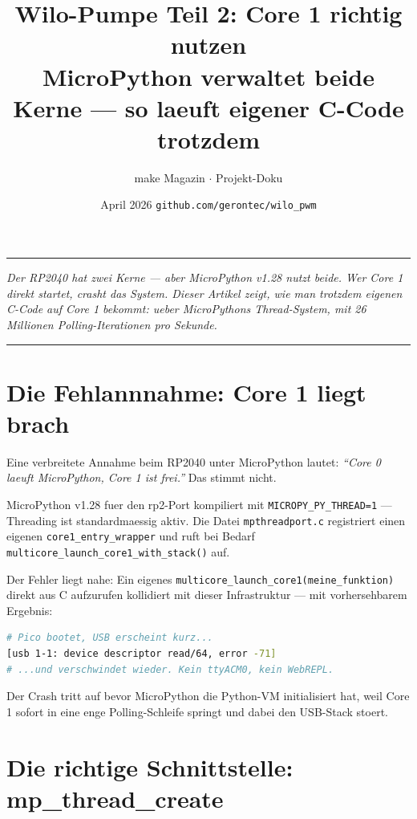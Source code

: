 \documentclass[11pt,a4paper]{article}
\title{\textbf{Wilo-Pumpe Teil 2: Core 1 richtig nutzen}\\[4pt]
  \large MicroPython verwaltet beide Kerne --- so laeuft eigener C-Code trotzdem}
\author{make Magazin $\cdot$ Projekt-Doku}
\date{April 2026 \quad \texttt{github.com/gerontec/wilo\_pwm}}
\begin{document}
\maketitle
\thispagestyle{empty}

\noindent\rule{\textwidth}{0.4pt}
\begin{center}
\textit{Der RP2040 hat zwei Kerne --- aber MicroPython v1.28 nutzt beide.
Wer Core 1 direkt startet, crasht das System.
Dieser Artikel zeigt, wie man trotzdem eigenen C-Code auf Core 1 bekommt:
ueber MicroPythons Thread-System, mit 26 Millionen Polling-Iterationen pro Sekunde.}
\end{center}
\noindent\rule{\textwidth}{0.4pt}

\bigskip

\section{Die Fehlannnahme: Core 1 liegt brach}

Eine verbreitete Annahme beim RP2040 unter MicroPython lautet:
\emph{``Core 0 laeuft MicroPython, Core 1 ist frei.''}
Das stimmt nicht.

MicroPython v1.28 fuer den rp2-Port kompiliert mit
\texttt{MICROPY\_PY\_THREAD=1} --- Threading ist standardmaessig aktiv.
Die Datei \texttt{mpthreadport.c} registriert einen eigenen
\texttt{core1\_entry\_wrapper} und ruft bei Bedarf
\texttt{multicore\_launch\_core1\_with\_stack()} auf.

Der Fehler liegt nahe: Ein eigenes
\texttt{multicore\_launch\_core1(meine\_funktion)} direkt aus C aufzurufen
kollidiert mit dieser Infrastruktur --- mit vorhersehbarem Ergebnis:

\begin{lstlisting}[language=bash, caption={Typisches Fehlerbild beim direkten Core-1-Start}]
# Pico bootet, USB erscheint kurz...
[usb 1-1: device descriptor read/64, error -71]
# ...und verschwindet wieder. Kein ttyACM0, kein WebREPL.
\end{lstlisting}

Der Crash tritt auf bevor MicroPython die Python-VM initialisiert hat,
weil Core 1 sofort in eine enge Polling-Schleife springt und dabei
den USB-Stack stoert.

\section{Die richtige Schnittstelle: mp\_thread\_create}
\end{document}
